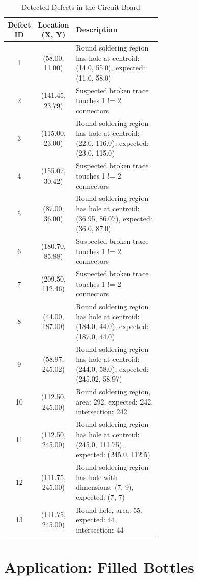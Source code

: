 \documentclass[a4paper,12pt]{article}
\begin{document}
\begin{table}[!htbp]
    \centering
    \caption{Detected Defects in the Circuit Board}
    \label{tab:defects}
    \begin{tabular}{|c|c|p{0.6\linewidth}|}
        \hline
        \textbf{Defect ID} & \textbf{Location (X, Y)} & \textbf{Description} \\
        \hline
        1 & (58.00, 11.00) & Round soldering region has hole at centroid: (14.0, 55.0), expected: (11.0, 58.0) \\
        2 & (141.45, 23.79) & Suspected broken trace touches 1 != 2 connectors \\
        3 & (115.00, 23.00) & Round soldering region has hole at centroid: (22.0, 116.0), expected: (23.0, 115.0) \\
        4 & (155.07, 30.42) & Suspected broken trace touches 1 != 2 connectors \\
        5 & (87.00, 36.00) & Round soldering region has hole at centroid: (36.95, 86.07), expected: (36.0, 87.0) \\
        6 & (180.70, 85.88) & Suspected broken trace touches 1 != 2 connectors \\
        7 & (209.50, 112.46) & Suspected broken trace touches 1 != 2 connectors \\
        8 & (44.00, 187.00) & Round soldering region has hole at centroid: (184.0, 44.0), expected: (187.0, 44.0) \\
        9 & (58.97, 245.02) & Round soldering region has hole at centroid: (244.0, 58.0), expected: (245.02, 58.97) \\
        10 & (112.50, 245.00) & Round soldering region, area: 292, expected: 242, intersection: 242 \\
        11 & (112.50, 245.00) & Round soldering region has hole at centroid: (245.0, 111.75), expected: (245.0, 112.5) \\
        12 & (111.75, 245.00) & Round soldering region has hole with dimensions: (7, 9), expected: (7, 7) \\
        13 & (111.75, 245.00) & Round hole, area: 55, expected: 44, intersection: 44 \\
        \hline
    \end{tabular}
\end{table}

\newpage

\section{Application: Filled Bottles}
\end{document}
